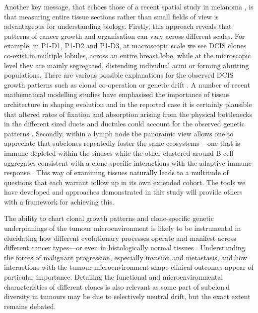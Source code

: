 Another key message, that echoes those of a recent spatial study in melanoma \parencite{Nirmal2022-sq}, is that measuring entire tissue sections rather than small fields of view is advantageous for understanding biology. Firstly, this approach reveals that patterns of cancer growth and organisation can vary across different scales. For example, in P1-D1, P1-D2 and P1-D3, at macroscopic scale we see \ac{DCIS} clones co-exist in multiple lobules, across an entire breast lobe, while at the microscopic level they are mainly segregated, distending individual acini or forming abutting populations. There are various possible explanations for the observed \ac{DCIS} growth patterns such as clonal co-operation or genetic drift \parencite{Janiszewska2019-zq, Turajlic2019-sr}. A number of recent mathematical modelling studies have emphasised the importance of tissue architecture in shaping evolution and in the reported case it is certainly plausible that altered rates of fixation and absorption arising from the physical bottlenecks in the different sized ducts and ductules could account for the observed genetic patterns \parencite{Lieberman2005-cy,Noble2022-eg,West2021-ar}. Secondly, within a lymph node the panoramic view allows one to appreciate that subclones repeatedly foster the same ecosystems – one that is immune depleted within the sinuses while the other clustered around B-cell aggregates consistent with a clone specific interactions with the adaptive immune response \parencite{Sharonov2020-vx}. This way of examining tissues naturally leads to a multitude of questions that each warrant follow up in its own extended cohort. The tools we have developed and approaches demonstrated in this study will provide others with a framework for achieving this.

The ability to chart clonal growth patterns and clone-specific genetic underpinnings of the tumour microenvironment is likely to be instrumental in elucidating how different evolutionary processes operate and manifest across different cancer types—or even in histologically normal tissues \parencite{Sottoriva2015-ci}. Understanding the forces of malignant progression, especially invasion and metastasis, and how interactions with the tumour microenvironment shape clinical outcomes \parencite{Risom2022-uw} appear of particular importance. Detailing the functional and microenvironmental characteristics of different clones is also relevant as some part of subclonal diversity in tumours may be due to selectively neutral drift, but the exact extent remains debated.


